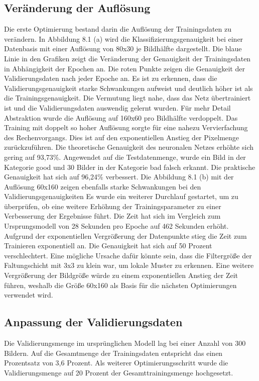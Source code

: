 \subsection{Veränderung der Auflösung}

Die erste Optimierung bestand darin die Auflösung der Trainingsdaten zu verändern.
In Abbildung 8.1 (a) wird die Klassifizierungsgenauigkeit bei einer Datenbasis mit 
einer Auflösung von 80x30 je Bildhälfte dargestellt. Die blaue Linie in den Grafiken zeigt
die Veränderung der Genauigkeit der Trainingsdaten in Abhängigkeit der Epochen an.
Die roten Punkte zeigen die Genauigkeit der Validierungsdaten nach jeder Epoche an.
Es ist zu erkennen, dass die Validierungsgenauigkeit starke Schwankungen aufweist und
deutlich höher ist als die Trainingsgenauigkeit. Die Vermutung liegt nahe, dass das Netz
übertrainiert ist und die Validierungsdaten auswendig gelernt wurden. Für mehr Detail
Abstraktion wurde die Auflösung auf 160x60 pro Bildhälfte verdoppelt. Das Training mit
doppelt so hoher Auflösung sorgte für eine nahezu Vervierfachung des Rechenvorgangs.
Dies ist auf den exponentiellen Anstieg der Pixelmenge zurückzuführen. Die theoretische
Genauigkeit des neuronalen Netzes erhöhte sich gering auf 93,73\%. Angewendet auf die
Testdatenmenge, wurde ein Bild in der Kategorie good und 30 Bilder in der Kategorie bad
falsch erkannt. Die praktische Genauigkeit hat sich auf 96,24\% verbessert. Die Abbildung
8.1 (b) mit der Auflösung 60x160 zeigen ebenfalls starke Schwankungen bei den 
Validierungsgenauigkeiten Es wurde ein weiterer Durchlauf gestartet, um zu überprüfen,
ob eine weitere Erhöhung der Trainingsparameter zu einer Verbesserung der Ergebnisse führt. 
Die Zeit hat sich im Vergleich zum Ursprungsmodell von 28 Sekunden pro Epoche auf 462
Sekunden erhöht. Aufgrund der exponentiellen Vergrößerung der Datenpunkte stieg die
Zeit zum Trainieren exponentiell an. Die Genauigkeit hat sich auf 50 Prozent 
verschlechtert. Eine mögliche Ursache dafür könnte sein, dass die Filtergröße der Faltungschicht mit
3x3 zu klein war, um lokale Muster zu erkennen. Eine weitere Vergrößerung der Bildgröße
würde zu einem exponentiellen Anstieg der Zeit führen, weshalb die Größe 60x160 als
Basis für die nächsten Optimierungen verwendet wird.

\subsection{Anpassung der Validierungsdaten}

Die Validierungsmenge im ursprünglichen Modell lag bei einer Anzahl von 300 Bildern.
Auf die Gesamtmenge der Trainingsdaten entspricht das einen Prozentsatz von 3,6 Prozent. 
Als weiterer Optimierungsschritt wurde die Validierungsmenge auf 20 Prozent der
Gesamttrainingsmenge hochgesetzt.


